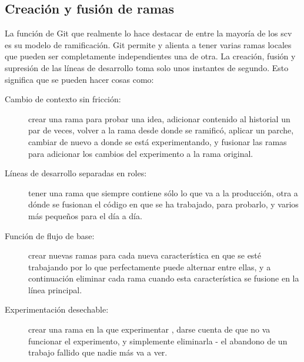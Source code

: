 \documentclass[12pt, spanish, oneside, onecolumn, a4paper]{report}
\begin{document}
\subsection{Creación y fusión de ramas} 
\label{sec:branchingandmerging} La función de Git que realmente lo hace destacar de entre la mayoría de los \gls{scv} es su modelo de ramificación. Git permite y alienta a tener varias ramas locales que pueden ser completamente independientes una de otra. La creación, fusión y supresión de las líneas de desarrollo toma solo unos instantes de segundo. Esto significa que se pueden hacer cosas como: 
\begin{description} 
\item [Cambio de contexto sin fricción:] crear una rama para probar una idea, adicionar contenido al historial un par de veces, volver a la rama desde donde se ramificó, aplicar un parche, cambiar de nuevo a donde se está experimentando, y fusionar las ramas para adicionar los cambios del experimento a la rama original. 
\item [Líneas de desarrollo separadas en roles:] tener una rama que siempre contiene sólo lo que va a la producción, otra a dónde se fusionan el código en que se ha trabajado, para probarlo, y varios más pequeños para el día a día. 
\item [Función de flujo de base:] crear nuevas ramas para cada nueva característica en que se esté trabajando por lo que perfectamente puede alternar entre ellas, y a continuación eliminar cada rama cuando esta característica se fusione en la línea principal. 
\item [Experimentación desechable:] crear una rama en la que experimentar , darse cuenta de que no va funcionar el experimento, y simplemente eliminarla - el abandono de un trabajo fallido que nadie más va a ver. 
\end{description} 
\end{document}
